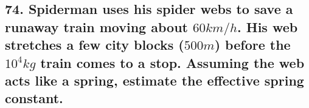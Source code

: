 \documentclass[12pt,a4paper,english]{article}
\begin{document}
\begin{flushleft}
  \subsection{74. Spiderman uses his spider webs to save a runaway train moving about $60km/h$. His web stretches a few city blocks ($500 m$) before the $10^4kg$ train comes to a stop. Assuming the web acts like a spring, estimate the effective spring constant.}
  \begin{align*}
  \end{align*}
\end{flushleft}
\end{document}

